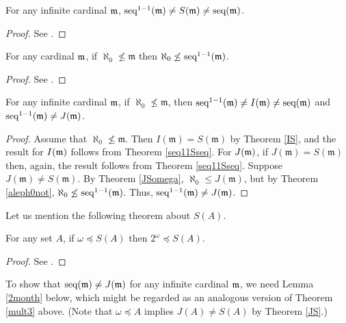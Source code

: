 \begin{theorem}\label{seq11Sseq}
For any infinite cardinal $\frak{m}$, $\seq^{1-1}(\mathfrak{m}) \neq S(\mathfrak{m}) \neq \seq(\mathfrak{m})$.

\end{theorem}

\begin{proof}
See \cite[Theorems 2.2 and 2.4]{SonVej2019}.
\end{proof}

\begin{theorem}\label{aleph0not} 
For any cardinal $\frak{m}$, if $\aleph_{0}\not\leq \mathfrak{m}$ then $\aleph_{0}\not\leq \seq^{1-1}(\mathfrak{m})$.
\end{theorem}

\begin{proof}
See \cite[Fact 2.14]{Shen}.
\end{proof}

\begin{theorem}\label{all2}
For any infinite cardinal $\frak{m}$, if $\aleph_{0}\not\leq\mathfrak{m}$, then $\seq^{1-1}(\mathfrak{m})\neq I(\mathfrak{m}) \neq \seq(\mathfrak{m})$ and $\seq^{1-1}(\mathfrak{m})\neq J(\mathfrak{m})$.
\end{theorem}

\begin{proof}
Assume that $\aleph_{0}\not\leq\mathfrak{m}$. Then $I(\mathfrak{m})=S(\mathfrak{m})$ by Theorem \ref{IS}, and the result for $I(\frak{m})$ follows from Theorem \ref{seq11Sseq}. For $J(\frak{m})$, if $J(\mathfrak{m})=S(\mathfrak{m})$ then, again, the result follows from Theorem \ref{seq11Sseq}. Suppose $J(\mathfrak{m})\neq S(\mathfrak{m})$. By Theorem \ref{JSomega}, $\aleph_{0}\leq J(\mathfrak{m})$, but by Theorem \ref{aleph0not}, $\aleph_{0} \not\leq \seq^{1-1}(\mathfrak{m})$. Thus, $\seq^{1-1}(\mathfrak{m})\neq J(\mathfrak{m})$.
\end{proof}

Let us mention the following theorem about $S(A)$.

\begin{theorem}\label{mult3}
For any set $A$, if $\omega\preceq S(A)$ then $2^\omega \preceq S(A)$.
\end{theorem}

\begin{proof}
See \cite[Theorem 2.3]{SonVej2019}.
\end{proof}

To show that $\seq(\mathfrak{m})\neq J(\mathfrak{m})$ for any infinite cardinal $\frak{m}$, we need Lemma \ref{2month} below, which might be regarded as an analogous version of Theorem \ref{mult3} above. (Note that $\omega \preceq A$ implies $J(A) \neq S(A)$ by Theorem \ref{JS}.)




